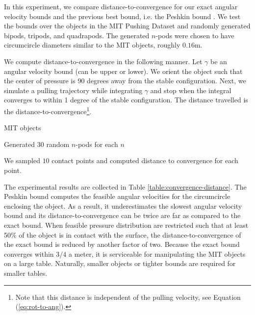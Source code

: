 \documentclass[conference]{IEEEtran}
\begin{document}
In this experiment, we compare distance-to-convergence for our exact
angular velocity bounds and the previous best bound, i.e. the Peshkin
bound \cite{peshkin1988motion}. We test the bounds over the objects in
the MIT Pushing Dataset \cite{} and randomly generated bipods,
tripods, and quadrapods. The generated $n$-pods were chosen to have
circumcircle diameters similar to the MIT objects, roughly
$0.16$m. 

We compute distance-to-convergence in the following manner. Let
$\gamma$ be an angular velocity bound (can be upper or lower). We
orient the object such that the center of pressure is 90 degrees away
from the stable configuration. Next, we simulate a pulling trajectory
while integrating $\gamma$ and stop when the integral converges to
within 1 degree of the stable configuration. The distance travelled is
the distance-to-convergence\footnote{Note that this distance is
  independent of the pulling velocity, see Equation
  (\ref{eq:rot-to-ang}).}.

\begin{inparaenum}
\item MIT objects
\item Generated 30 random $n$-pods for each $n$
\item We sampled $10$ contact points and computed distance to
  convergence for each point.
\end{inparaenum}

The experimental results are collected in Table
\ref{table:convergence-distance}. 
The Peshkin bound computes the feasible angular velocities for the
circumcircle enclosing the object. As a result, it underestimates the
slowest angular velocity bound and its distance-to-convergence can be
twice are far as compared to the exact bound.  When feasible pressure
distribution are restricted such that at least 50\% of the object is
in contact with the surface, the distance-to-convergence of the exact
bound is reduced by another factor of two. Because the exact bound
converges within $3/4$ a meter, it is serviceable for manipulating the
MIT objects on a large table. Naturally, smaller objects or tighter
bounds are required for smaller tables.
\end{document}
